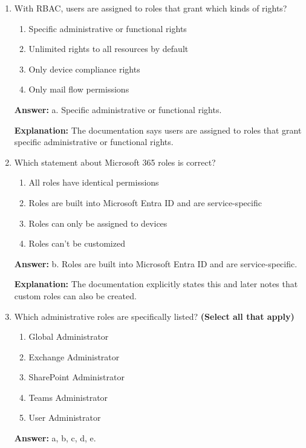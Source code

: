 \documentclass[10pt]{article}
\begin{document}
\begin{enumerate}[leftmargin=*]
\textbf{Explanation:} The Role-based access control section says Microsoft 365 uses RBAC as a central mechanism for authorization.

\item With RBAC, users are assigned to roles that grant which kinds of rights?
\begin{enumerate}[label=\alph*., leftmargin=1.5em]
\item Specific administrative or functional rights
\item Unlimited rights to all resources by default
\item Only device compliance rights
\item Only mail flow permissions
\end{enumerate}
\textbf{Answer:} a. Specific administrative or functional rights.

\textbf{Explanation:} The documentation says users are assigned to roles that grant specific administrative or functional rights.

\item Which statement about Microsoft 365 roles is correct?
\begin{enumerate}[label=\alph*., leftmargin=1.5em]
\item All roles have identical permissions
\item Roles are built into Microsoft Entra ID and are service-specific
\item Roles can only be assigned to devices
\item Roles can’t be customized
\end{enumerate}
\textbf{Answer:} b. Roles are built into Microsoft Entra ID and are service-specific.

\textbf{Explanation:} The documentation explicitly states this and later notes that custom roles can also be created.

\item Which administrative roles are specifically listed? \textbf{(Select all that apply)}
\begin{enumerate}[label=\alph*., leftmargin=1.5em]
\item Global Administrator
\item Exchange Administrator
\item SharePoint Administrator
\item Teams Administrator
\item User Administrator
\end{enumerate}
\textbf{Answer:} a, b, c, d, e.


\end{enumerate}
\end{document}
